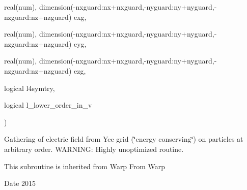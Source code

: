 {\begin{DoxyParamCaption}
\item[{real(num), dimension(-\/nxguard\+:nx+nxguard,-\/nyguard\+:ny+nyguard,-\/nzguard\+:nz+nzguard)}]{exg, }
\item[{real(num), dimension(-\/nxguard\+:nx+nxguard,-\/nyguard\+:ny+nyguard,-\/nzguard\+:nz+nzguard)}]{eyg, }
\item[{real(num), dimension(-\/nxguard\+:nx+nxguard,-\/nyguard\+:ny+nyguard,-\/nzguard\+:nz+nzguard)}]{ezg, }
\item[{logical}]{l4symtry, }
\item[{logical}]{l\+\_\+lower\+\_\+order\+\_\+in\+\_\+v}
\end{DoxyParamCaption}
)}\hypertarget{field__gathering_8_f90_af8a29b924d0086de0d933851a07b5f32}{}\label{field__gathering_8_f90_af8a29b924d0086de0d933851a07b5f32}


Gathering of electric field from Yee grid (\char`\"{}energy conserving\char`\"{}) on particles at arbitrary order. W\+A\+R\+N\+I\+NG\+: Highly unoptimized routine. 

This subroutine is inherited from Warp  From Warp \begin{DoxyDate}{Date}
2015 
\end{DoxyDate}
